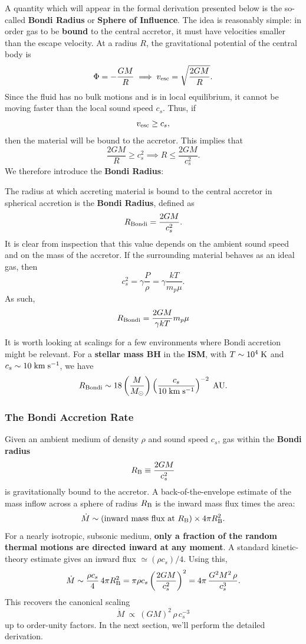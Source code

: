 A quantity which will appear in the formal derivation presented below is the so-called \textbf{Bondi Radius} or \textbf{Sphere of Influence}. The idea is reasonably simple: in order gas to be \textbf{bound} to the central accretor, it must have velocities smaller than the escape velocity. At a radius $R$, the gravitational potential of the central body is
\[
\Phi = - \frac{GM}{R} \implies v_{\rm esc} = \sqrt{\frac{2GM}{R}}.
\]
Since the fluid has no bulk motions and is in local equilibrium, it cannot be moving faster than the local sound speed $c_s$. Thus, if 
\[
v_{\rm esc} \ge c_s,
\]
then the material will be bound to the accretor. This implies that
\[
\frac{2GM}{R} \ge c_s^2 \implies R \le \frac{2GM}{c_s^2}.
\]
We therefore introduce the \textbf{Bondi Radius}:
\vspace{20pt}
\begin{definition}
    \label{def:bondi_radius}
    The radius at which accreting material is bound to the central accretor in spherical accretion is the \textbf{Bondi Radius}, defined as
    \begin{equation}
        \label{eq:bondi_radius}
        R_{\rm Bondi} = \frac{2GM}{c_s^2}.
    \end{equation}
It is clear from inspection that this value depends on the ambient sound speed and on the mass of the accretor. If the surrounding material behaves as an ideal gas, then
\[
c_s^2 = \gamma \frac{P}{\rho} = \gamma \frac{kT}{m_p\mu}.
\]
As such,
\[
R_{\rm Bondi} = \frac{2GM}{\gamma kT} m_p\mu
\]
\end{definition}
\vspace{20pt}
It is worth looking at scalings for a few environments where Bondi accretion might be relevant. For a \textbf{stellar mass BH} in the \textbf{ISM}, with $T \sim 10^{4}\;{\rm K}$ and $c_s\sim 10\;{\rm km\;s^{-1}}$, we have
\[
R_{\rm Bondi} \sim 18 \left(\frac{M}{M_\odot}\right) \left(\frac{c_s}{10\;{\rm km\;s^{-1}}}\right)^{-2} \;{\rm AU}.
\]
\subsubsection{The Bondi Accretion Rate}

Given an ambient medium of density $\rho$ and sound speed $c_s$, gas within the
\textbf{Bondi radius}
\[
R_{\rm B} \equiv \frac{2GM}{c_s^2}
\]
is gravitationally bound to the accretor. A back-of-the-envelope estimate of the mass inflow across a sphere of radius $R_{\rm B}$ is the inward mass flux times the area:
\[
\dot M \sim ( \text{inward mass flux at } R_{\rm B}) \times 4\pi R_{\rm B}^2.
\]
For a nearly isotropic, subsonic medium, \textbf{only a fraction of the random thermal motions are directed inward at any moment}. A standard kinetic-theory estimate gives an inward flux $\simeq (\rho c_s)/4$. Using this,
\[
\dot M \sim \frac{\rho c_s}{4}\,4\pi R_{\rm B}^2
= \pi \rho c_s \left(\frac{2GM}{c_s^2}\right)^2
= 4\pi\,\frac{G^2 M^2\,\rho}{c_s^3}.
\]
This recovers the canonical scaling
\[
\boxed{\ \dot M \ \propto\ (GM)^2\,\rho\,c_s^{-3}\ }
\]
up to order-unity factors. In the next section, we'll perform the detailed derivation.

